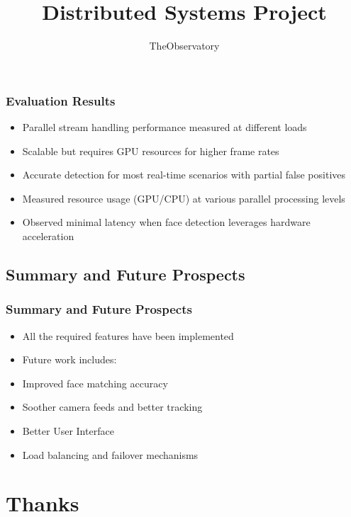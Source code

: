 \documentclass[11pt,t,usepdftitle=false,aspectratio=169]{beamer}
\begin{document}
\begin{frame}
\frametitle{Evaluation Results}
\begin{itemize}
	\item Parallel stream handling performance measured at different loads
	\item Scalable but requires GPU resources for higher frame rates
	\item Accurate detection for most real-time scenarios with partial false positives
	\item Measured resource usage (GPU/CPU) at various parallel processing levels
	\item Observed minimal latency when face detection leverages hardware acceleration
\end{itemize}
\end{frame}

\subsection{Summary and Future Prospects}
\begin{frame}
\frametitle{Summary and Future Prospects}

\begin{itemize}
	\item All the required features have been implemented
	\item Future work includes:
	\item {Improved face matching accuracy}
	\item {Soother camera feeds and better tracking}
	\item {Better User Interface}
	\item {Load balancing and failover mechanisms}
\end{itemize}

\end{frame}


\title[TheObservatory]{Distributed Systems Project}
\subtitle{TheObservatory}
\section{Thanks}
\end{document}
